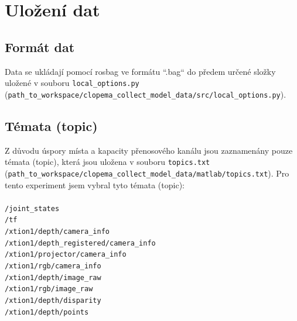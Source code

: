 \documentclass[10pt,a4paper,titlepage,oneside]{report}
\begin{document}

\chapter{Uložení dat}

\section{Formát dat}
Data se ukládají pomocí rosbag ve formátu “.bag“ do předem určené složky uložené v souboru \verb|local_options.py| (\verb|path_to_workspace/clopema_collect_model_data/src/local_options.py|).
\\

\section{Témata (topic)}
Z důvodu úspory místa a kapacity přenosového kanálu jsou zaznamenány pouze témata (topic), která jsou uložena v souboru \verb|topics.txt|  (\verb|path_to_workspace/clopema_collect_model_data/matlab/topics.txt|). Pro tento experiment jsem vybral tyto témata (topic):\\
\\
\indent \indent \indent \verb|/joint_states| \\
\indent \indent \indent \verb|/tf| \\
\indent \indent \indent \verb|/xtion1/depth/camera_info| \\
\indent \indent \indent \verb|/xtion1/depth_registered/camera_info| \\
\indent \indent \indent \verb|/xtion1/projector/camera_info| \\
\indent \indent \indent \verb|/xtion1/rgb/camera_info| \\
\indent \indent \indent \verb|/xtion1/depth/image_raw| \\
\indent \indent \indent \verb|/xtion1/rgb/image_raw |\\
\indent \indent \indent \verb|/xtion1/depth/disparity |\\
\indent \indent \indent \verb|/xtion1/depth/points|\\
\end{document}
